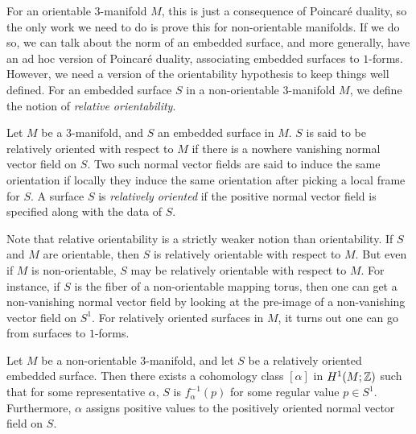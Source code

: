For an orientable $3$-manifold $M$, this is just a consequence of Poincar\'e duality, so the only
work we need to do is prove this for non-orientable manifolds. If we do so, we can talk about the
norm of an embedded surface, and more generally, have an ad hoc version of Poincar\'e duality,
associating embedded surfaces to $1$-forms. However, we need a version of the orientability
hypothesis to keep things well defined. For an embedded surface $S$ in a non-orientable
$3$-manifold $M$, we define the notion of \emph{relative orientability}.

\begin{defn}
  Let $M$ be a $3$-manifold, and $S$ an embedded surface in $M$. $S$ is said to be relatively
  oriented with respect to $M$ if there is a nowhere vanishing normal vector field on $S$. Two
  such normal vector fields are said to induce the same orientation if locally they induce the
  same orientation after picking a local frame for $S$. A surface $S$ is \emph{relatively oriented}
  if the positive normal vector field is specified along with the data of $S$.
\end{defn}

Note that relative orientability is a strictly weaker notion than orientability. If $S$ and $M$ are
orientable, then $S$ is relatively orientable with respect to $M$. But even if $M$ is
non-orientable, $S$ may be relatively orientable with respect to $M$. For instance, if $S$ is
the fiber of a non-orientable mapping torus, then one can get a non-vanishing normal vector field
by looking at the pre-image of a non-vanishing vector field on $S^1$. For relatively oriented
surfaces in $M$, it turns out one can go from surfaces to $1$-forms.

\begin{thm}
  \label{thm:Poincare-duality}
  Let $M$ be a non-orientable $3$-manifold, and let $S$ be a relatively oriented embedded
  surface. Then there exists a cohomology class $[\alpha]$ in $H^1(M; \mathbb{Z})$ such that for some
  representative $\alpha$, $S$ is $f_{\alpha}^{-1}(p)$ for some regular value $p \in
  S^1$. Furthermore, $\alpha$ assigns positive values to the positively oriented normal vector
  field on $S$.
\end{thm}

